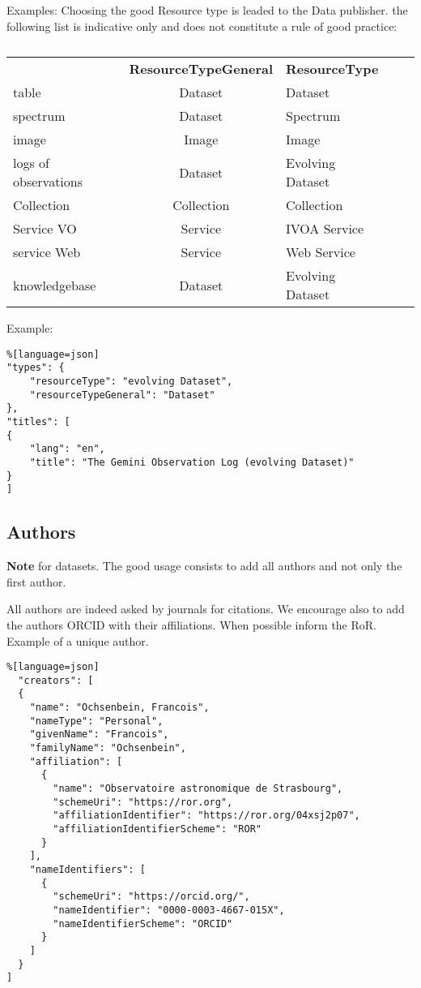 \documentclass[11pt,a4paper]{ivoa}
\newcommand{\important}[1]{
	\begin{bigdescription}
		\item \color{ivoacolor}\textbf{Note} #1
	\end{bigdescription}
}
\begin{document}
Examples: Choosing the good Resource type is leaded to the Data publisher.
the following list is indicative only and does not constitute a rule of good practice:

\begin{table}[th]
\begin{tabular}{lclcr}
	\sptablerule
	 & \textbf{ResourceTypeGeneral} & \textbf{ResourceType}  \\
	\sptablerule
table         & Dataset             & Dataset          \\
spectrum      & Dataset             & Spectrum         \\
image         & Image               & Image            \\
logs of observations & Dataset      & Evolving Dataset \\
Collection    & Collection          & Collection       \\
Service VO    & Service             & IVOA Service     \\
service Web   & Service             & Web Service      \\
knowledgebase & Dataset             & Evolving Dataset \\  
\end{tabular}%
\caption{\label{tab:resourcetype}}
\end{table}

Example:

\begin{lstlisting}%[language=json]
"types": {
	"resourceType": "evolving Dataset",
	"resourceTypeGeneral": "Dataset"
},
"titles": [
{
	"lang": "en",
	"title": "The Gemini Observation Log (evolving Dataset)"
}
]
\end{lstlisting}

\subsection{Authors}\label{sec:authors}

\important{for datasets. The good usage consists to add all authors and not only the first author. }


All authors are indeed asked by journals for citations.
We encourage also to add the authors ORCID with their affiliations. When possible inform the RoR.\\

Example of a unique author.

\begin{lstlisting}%[language=json]
  "creators": [
  {
    "name": "Ochsenbein, Francois",
    "nameType": "Personal",
    "givenName": "Francois",
    "familyName": "Ochsenbein",
    "affiliation": [
      {
        "name": "Observatoire astronomique de Strasbourg",
        "schemeUri": "https://ror.org",
        "affiliationIdentifier": "https://ror.org/04xsj2p07",
        "affiliationIdentifierScheme": "ROR"
      }
    ],
    "nameIdentifiers": [
      {
        "schemeUri": "https://orcid.org/",
        "nameIdentifier": "0000-0003-4667-015X",
        "nameIdentifierScheme": "ORCID"
      }
    ]
  }
]
\end{lstlisting}
\end{document}
